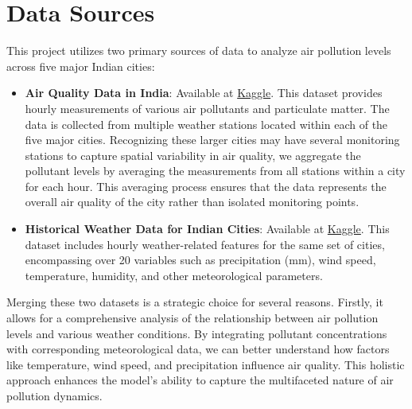 \documentclass[12pt]{article}
\begin{document}
\newpage




\section{Data Sources}

This project utilizes two primary sources of data to analyze air pollution levels across five major Indian cities:

\begin{itemize}
    \item \textbf{Air Quality Data in India}: Available at \href{https://www.kaggle.com/datasets/rohanrao/air-quality-data-in-india}{Kaggle}. This dataset provides hourly measurements of various air pollutants and particulate matter. The data is collected from multiple weather stations located within each of the five major cities. Recognizing these larger cities may have several monitoring stations to capture spatial variability in air quality, we aggregate the pollutant levels by averaging the measurements from all stations within a city for each hour. This averaging process ensures that the data represents the overall air quality of the city rather than isolated monitoring points.

    \item \textbf{Historical Weather Data for Indian Cities}: Available at \href{https://www.kaggle.com/datasets/hiteshsoneji/historical-weather-data-for-indian-cities?fbclid=IwY2xjawGJ4RpleHRuA2FlbQIxMAABHWvTrmK5HZhuOtOFaGmaStWQzwC0LiOHtK08q87gTHdQ36p_YVT9hVDUlg_aem_A0W4rpnHatpUfV7CUXfkkA}{Kaggle}. This dataset includes hourly weather-related features for the same set of cities, encompassing over 20 variables such as precipitation (mm), wind speed, temperature, humidity, and other meteorological parameters.
\end{itemize}

Merging these two datasets is a strategic choice for several reasons. Firstly, it allows for a comprehensive analysis of the relationship between air pollution levels and various weather conditions. By integrating pollutant concentrations with corresponding meteorological data, we can better understand how factors like temperature, wind speed, and precipitation influence air quality. This holistic approach enhances the model's ability to capture the multifaceted nature of air pollution dynamics.
\end{document}
